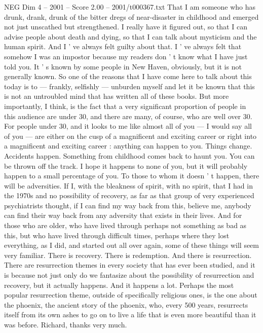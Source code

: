 \begin{textsample}{NEG Dim 4 – 2001 – Score 2.00 – 2001/t000367.txt}
That I am someone who has drunk, drank, drunk of the bitter dregs of near-disaster in childhood and emerged not just unscathed but strengthened.
I really have it figured out, so that I can advise people about death and dying, so that I can talk about mysticism and the human spirit.
And I ' ve always felt guilty about that.
I ' ve always felt that somehow I was an impostor because my readers don ' t know what I have just told you.
It ' s known by some people in New Haven, obviously, but it is not generally known.
So one of the reasons that I have come here to talk about this today is to — frankly, selfishly — unburden myself and let it be known that this is not an untroubled mind that has written all of these books.
But more importantly, I think, is the fact that a very significant proportion of people in this audience are under 30, and there are many, of course, who are well over 30.
For people under 30, and it looks to me like almost all of you — I would say all of you — are either on the cusp of a magnificent and exciting career or right into a magnificent and exciting career : anything can happen to you.
Things change.
Accidents happen.
Something from childhood comes back to haunt you.
You can be thrown off the track.
I hope it happens to none of you, but it will probably happen to a small percentage of you.
To those to whom it doesn ' t happen, there will be adversities.
If I, with the bleakness of spirit, with no spirit, that I had in the 1970s and no possibility of recovery, as far as that group of very experienced psychiatrists thought, if I can find my way back from this, believe me, anybody can find their way back from any adversity that exists in their lives.
And for those who are older, who have lived through perhaps not something as bad as this, but who have lived through difficult times, perhaps where they lost everything, as I did, and started out all over again, some of these things will seem very familiar.
There is recovery.
There is redemption.
And there is resurrection.
There are resurrection themes in every society that has ever been studied, and it is because not just only do we fantasize about the possibility of resurrection and recovery, but it actually happens.
And it happens a lot.
Perhaps the most popular resurrection theme, outside of specifically religious ones, is the one about the phoenix, the ancient story of the phoenix, who, every 500 years, resurrects itself from its own ashes to go on to live a life that is even more beautiful than it was before.
Richard, thanks very much.

\end{textsample}
